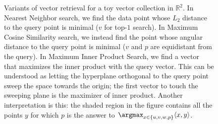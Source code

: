 \begin{figure}[t]
    \centering
    \caption{Variants of vector retrieval for a toy vector collection in $\mathbb{R}^2$.
    In Nearest Neighbor search, we find the data point whose $L_2$ distance to the
    query point is minimal ($v$ for top-$1$ search). In Maximum Cosine Similarity search, we instead find the point whose
    angular distance to the query point is minimal ($v$ and $p$ are equidistant from the query).
    In Maximum Inner Product Search, we find a vector that maximizes the inner product with the query
    vector. This can be understood as letting the hyperplane orthogonal to the query point sweep the
    space towards the origin; the first vector to touch the sweeping plane is the maximizer of inner product.
    Another interpretation is this: the shaded region in the figure contains all the points $y$
    for which $p$ is the answer to $\argmax_{x \in \{ u, v, w, p\}} \langle x, y \rangle$.}
    \label{figure:flavors:flavors}
\end{figure}


